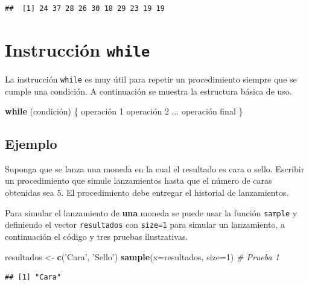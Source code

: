 \documentclass[10pt,]{krantz}
\makeatletter
\newenvironment{Shaded}{\begin{snugshade}}{\end{snugshade}}
\newcommand{\KeywordTok}[1]{\textcolor[rgb]{0.13,0.29,0.53}{\textbf{#1}}}
\newcommand{\DataTypeTok}[1]{\textcolor[rgb]{0.13,0.29,0.53}{#1}}
\newcommand{\DecValTok}[1]{\textcolor[rgb]{0.00,0.00,0.81}{#1}}
\newcommand{\StringTok}[1]{\textcolor[rgb]{0.31,0.60,0.02}{#1}}
\newcommand{\CommentTok}[1]{\textcolor[rgb]{0.56,0.35,0.01}{\textit{#1}}}
\newcommand{\ControlFlowTok}[1]{\textcolor[rgb]{0.13,0.29,0.53}{\textbf{#1}}}
\newcommand{\NormalTok}[1]{#1}
\newenvironment{kframe}{%
\medskip{}
\setlength{\fboxsep}{.8em}
 \def\at@end@of@kframe{}%
 \ifinner\ifhmode%
  \def\at@end@of@kframe{\end{minipage}}%
  \begin{minipage}{\columnwidth}%
 \fi\fi%
 \def\FrameCommand##1{\hskip\@totalleftmargin \hskip-\fboxsep
 \colorbox{shadecolor}{##1}\hskip-\fboxsep
     \hskip-\linewidth \hskip-\@totalleftmargin \hskip\columnwidth}%
 \MakeFramed {\advance\hsize-\width
   \@totalleftmargin\z@ \linewidth\hsize
   \@setminipage}}%
 {\par\unskip\endMakeFramed%
 \at@end@of@kframe}
\renewenvironment{Shaded}{\begin{kframe}}{\end{kframe}}
\makeatother
\begin{document}
\begin{verbatim}
##  [1] 24 37 28 26 30 18 29 23 19 19
\end{verbatim}

\section{\texorpdfstring{Instrucción \texttt{while}
}{Instrucción while }}\label{instruccion-while}

La instrucción \texttt{while} es muy útil para repetir un procedimiento
siempre que se cumple una condición. A continuación se muestra la
estructura básica de uso.

\begin{Shaded}
\begin{Highlighting}[]
\ControlFlowTok{while}\NormalTok{ (condición) \{}
\NormalTok{  operación }\DecValTok{1}
\NormalTok{  operación }\DecValTok{2}
\NormalTok{  ...}
\NormalTok{  operación final}
\NormalTok{\}}
\end{Highlighting}
\end{Shaded}

\subsection*{Ejemplo}\label{ejemplo-18}


Suponga que se lanza una moneda en la cual el resultado es cara o sello.
Escribir un procedimiento que simule lanzamientos hasta que el número de
caras obtenidas sea 5. El procedimiento debe entregar el historial de
lanzamientos.

Para simular el lanzamiento de \textbf{una} moneda se puede usar la
función \texttt{sample} y definiendo el vector \texttt{resultados} con
\texttt{size=1} para simular un lanzamiento, a continuación el código y
tres pruebas ilustrativas.

\begin{Shaded}
\begin{Highlighting}[]
\NormalTok{resultados <-}\StringTok{ }\KeywordTok{c}\NormalTok{(}\StringTok{'Cara'}\NormalTok{, }\StringTok{'Sello'}\NormalTok{)}
\KeywordTok{sample}\NormalTok{(}\DataTypeTok{x=}\NormalTok{resultados, }\DataTypeTok{size=}\DecValTok{1}\NormalTok{)  }\CommentTok{# Prueba 1}
\end{Highlighting}
\end{Shaded}

\begin{verbatim}
## [1] "Cara"
\end{verbatim}
\end{document}

